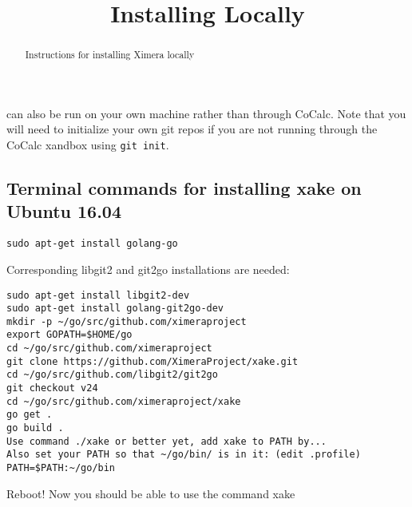 \documentclass{ximera}
\title{Installing Locally}
\begin{document}
\begin{abstract}
Instructions for installing Ximera locally
\end{abstract}
\maketitle

% 
 can also be run on your own machine rather than through CoCalc. Note that you will need to initialize your own git repos if you are not running through the CoCalc xandbox using \verb!git init!.

\subsection{Terminal commands for installing xake on Ubuntu 16.04}
\begin{verbatim}
sudo apt-get install golang-go
\end{verbatim}
Corresponding libgit2 and git2go installations are needed:
\begin{verbatim}
sudo apt-get install libgit2-dev
sudo apt-get install golang-git2go-dev
mkdir -p ~/go/src/github.com/ximeraproject
export GOPATH=$HOME/go
cd ~/go/src/github.com/ximeraproject
git clone https://github.com/XimeraProject/xake.git
cd ~/go/src/github.com/libgit2/git2go
git checkout v24
cd ~/go/src/github.com/ximeraproject/xake
go get .
go build .
Use command ./xake or better yet, add xake to PATH by...
Also set your PATH so that ~/go/bin/ is in it: (edit .profile)
PATH=$PATH:~/go/bin
\end{verbatim}
Reboot!  Now you should be able to use the command xake
\end{document}
